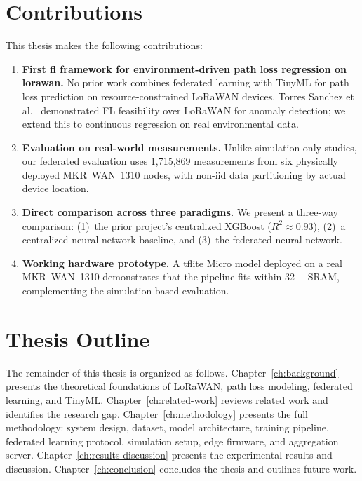\section{Contributions}
\label{sec:contributions}

This thesis makes the following contributions:
\begin{enumerate}
  \item \textbf{First \gls{fl} framework for environment-driven path loss regression
    on \gls{lorawan}.} No prior work combines federated learning with TinyML for path
    loss prediction on resource-constrained LoRaWAN devices. Torres Sanchez et
    al.~\cite{torressanchez2024federated} demonstrated FL feasibility over LoRaWAN for anomaly
    detection; we extend this to continuous regression on real environmental data.

  \item \textbf{Evaluation on real-world measurements.} Unlike simulation-only studies,
    our federated evaluation uses 1,715,869 measurements from six physically deployed
    MKR~WAN~1310 nodes, with non-\gls{iid} data partitioning by actual device location.

  \item \textbf{Direct comparison across three paradigms.} We present a three-way
    comparison: (1)~the prior project's centralized XGBoost ($R^2 \approx 0.93$),
    (2)~a centralized neural network baseline, and (3)~the federated neural network.

  \item \textbf{Working hardware prototype.} A \gls{tflite} Micro model deployed on a
    real MKR~WAN~1310 demonstrates that the pipeline fits within \SI{32}{\kilo\byte}
    SRAM, complementing the simulation-based evaluation.
\end{enumerate}

\section{Thesis Outline}
\label{sec:outline}

The remainder of this thesis is organized as follows.
Chapter~\ref{ch:background} presents the theoretical foundations of LoRaWAN, path loss
modeling, federated learning, and TinyML.
Chapter~\ref{ch:related-work} reviews related work and identifies the research gap.
Chapter~\ref{ch:methodology} presents the full methodology: system design, dataset,
model architecture, training pipeline, federated learning protocol, simulation setup,
edge firmware, and aggregation server.
Chapter~\ref{ch:results-discussion} presents the experimental results and discussion.
Chapter~\ref{ch:conclusion} concludes the thesis and outlines future work.
